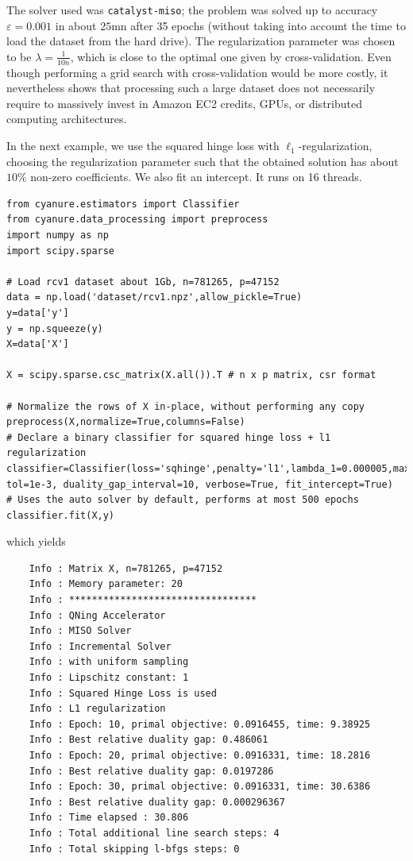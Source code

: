 \documentclass{article}
\begin{document}
The solver used was \texttt{catalyst-miso}; the problem was solved up to
accuracy $\varepsilon=0.001$ in about $25$mn after 35 epochs (without taking into account
the time to load the dataset from the hard drive). The regularization
parameter was chosen to be $\lambda=\frac{1}{10n}$, which is close to the
optimal one given by cross-validation.  Even though performing a grid search with
cross-validation would be more costly, it nevertheless shows that processing such 
a large dataset does not necessarily require to massively invest in Amazon EC2 credits,
GPUs, or distributed computing architectures.

In the next example, we use the squared hinge loss with
$\ell_1$-regularization, choosing the regularization parameter such that the
obtained solution has about $10\%$ non-zero coefficients.
We also fit an intercept. It runs on 16 threads.

\begin{verbatim}
from cyanure.estimators import Classifier
from cyanure.data_processing import preprocess
import numpy as np
import scipy.sparse

# Load rcv1 dataset about 1Gb, n=781265, p=47152
data = np.load('dataset/rcv1.npz',allow_pickle=True)
y=data['y']
y = np.squeeze(y)
X=data['X']

X = scipy.sparse.csc_matrix(X.all()).T # n x p matrix, csr format

# Normalize the rows of X in-place, without performing any copy
preprocess(X,normalize=True,columns=False)
# Declare a binary classifier for squared hinge loss + l1 regularization
classifier=Classifier(loss='sqhinge',penalty='l1',lambda_1=0.000005,max_iter=500,
tol=1e-3, duality_gap_interval=10, verbose=True, fit_intercept=True)
# Uses the auto solver by default, performs at most 500 epochs
classifier.fit(X,y)
\end{verbatim}

which yields
\begin{minipage}{\linewidth}
\begin{verbatim}
    Info : Matrix X, n=781265, p=47152
    Info : Memory parameter: 20
    Info : *********************************
    Info : QNing Accelerator
    Info : MISO Solver
    Info : Incremental Solver
    Info : with uniform sampling
    Info : Lipschitz constant: 1
    Info : Squared Hinge Loss is used
    Info : L1 regularization
    Info : Epoch: 10, primal objective: 0.0916455, time: 9.38925
    Info : Best relative duality gap: 0.486061
    Info : Epoch: 20, primal objective: 0.0916331, time: 18.2816
    Info : Best relative duality gap: 0.0197286
    Info : Epoch: 30, primal objective: 0.0916331, time: 30.6386
    Info : Best relative duality gap: 0.000296367
    Info : Time elapsed : 30.806
    Info : Total additional line search steps: 4
    Info : Total skipping l-bfgs steps: 0
\end{verbatim}
\end{minipage}
\end{document}
